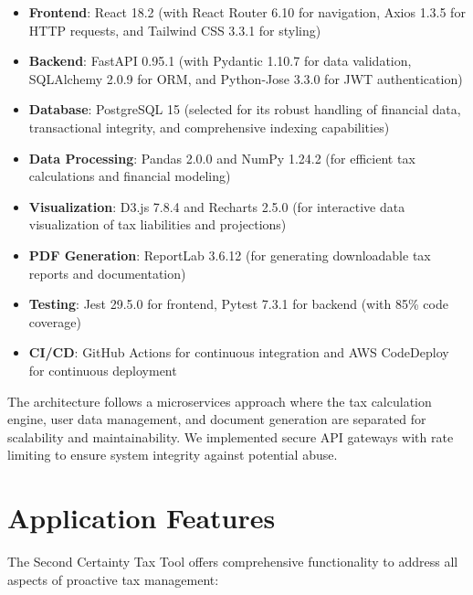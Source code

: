 \documentclass[
  11pt,
  letterpaper,
]{article}
\providecommand{\tightlist}{%
  \setlength{\itemsep}{0pt}\setlength{\parskip}{0pt}}\usepackage{longtable,booktabs,array}
\begin{document}
\begin{itemize}
\tightlist
\item
  \textbf{Frontend}: React 18.2 (with React Router 6.10 for navigation,
  Axios 1.3.5 for HTTP requests, and Tailwind CSS 3.3.1 for styling)
\item
  \textbf{Backend}: FastAPI 0.95.1 (with Pydantic 1.10.7 for data
  validation, SQLAlchemy 2.0.9 for ORM, and Python-Jose 3.3.0 for JWT
  authentication)
\item
  \textbf{Database}: PostgreSQL 15 (selected for its robust handling of
  financial data, transactional integrity, and comprehensive indexing
  capabilities)
\item
  \textbf{Data Processing}: Pandas 2.0.0 and NumPy 1.24.2 (for efficient
  tax calculations and financial modeling)
\item
  \textbf{Visualization}: D3.js 7.8.4 and Recharts 2.5.0 (for
  interactive data visualization of tax liabilities and projections)
\item
  \textbf{PDF Generation}: ReportLab 3.6.12 (for generating downloadable
  tax reports and documentation)
\item
  \textbf{Testing}: Jest 29.5.0 for frontend, Pytest 7.3.1 for backend
  (with 85\% code coverage)
\item
  \textbf{CI/CD}: GitHub Actions for continuous integration and AWS
  CodeDeploy for continuous deployment
\end{itemize}

The architecture follows a microservices approach where the tax
calculation engine, user data management, and document generation are
separated for scalability and maintainability. We implemented secure API
gateways with rate limiting to ensure system integrity against potential
abuse.

\hypertarget{application-features}{%
\section{Application Features}\label{application-features}}

The Second Certainty Tax Tool offers comprehensive functionality to
address all aspects of proactive tax management:
\end{document}

